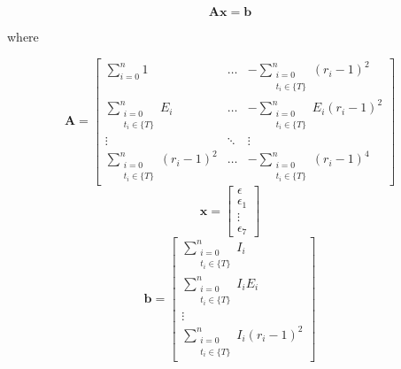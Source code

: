 \begin{equation}
    \label{eq:LinearRegMatrixEquation}
	\mathbf{Ax=b}
\end{equation}
\centerline{where}
\begin{equation*}
    \mathbf{A}=\left[
    \begin{matrix}
        \sum_{i=0}^n 1 &
        \dots &
        -\sum_{\substack{i=0\\ t_i\in \{ T \}}}^n (r_i-1)^2 \\

        \sum_{\substack{i=0\\ t_i\in \{ T \}}}^n  E_i &
        \dots &
        -\sum_{\substack{i=0\\ t_i\in \{ T \}}}^n E_i (r_i-1)^2\\

        \vdots &
        \ddots &
        \vdots \\
        
        \sum_{\substack{i=0\\ t_i\in \{ T \}}}^n (r_i-1)^2 &
        \dots &
        -\sum_{\substack{i=0\\ t_i\in \{ T \}}}^n (r_i-1)^4
    \end{matrix}
    \right]
\end{equation*}
\begin{equation*}
    \mathbf{x}=\left[
    \begin{matrix}
        \epsilon \\ \epsilon_1 \\ \vdots \\ \epsilon_7
    \end{matrix}
    \right]
\end{equation*}
\begin{equation*}
    \mathbf{b}=\left[
    \begin{matrix}
        \sum_{\substack{i=0\\ t_i\in \{ T \}}}^n I_i \\
        \sum_{\substack{i=0\\ t_i\in \{ T \}}}^n I_i E_i \\
        \vdots \\
        \sum_{\substack{i=0\\ t_i\in \{ T \}}}^n I_i(r_i-1)^2 
    \end{matrix}
    \right]
\end{equation*}

